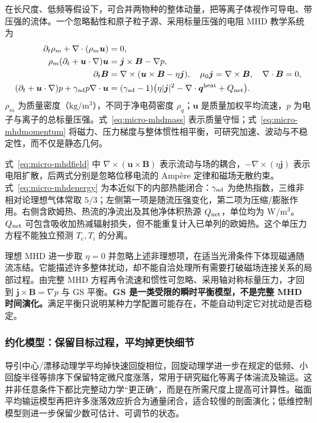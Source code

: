 \documentclass[12pt,fontset=none]{ctexart}
\numberwithin{equation}{section}
\numberwithin{table}{section}
\numberwithin{figure}{section}
\begin{document}
在长尺度、低频等假设下，可合并两物种的整体动量，把等离子体视作可导电、带压强的流体。一个忽略黏性和原子粒子源、采用标量压强的电阻 MHD 教学系统为\cite{Pmhd}
\begin{align}
 \partial_t\rho_m+\nabla\cdot(\rho_m\bm u)&=0,\label{eq:micro-mhdmass}\\
 \rho_m(\partial_t+\bm u\cdot\nabla)\bm u
 &=\bm j\times\bm B-\nabla p,\label{eq:micro-mhdmomentum}\\
 \partial_t\bm B&=\nabla\times(\bm u\times\bm B-\eta\bm j),
 \quad \mu_0\bm j=\nabla\times\bm B,\quad\nabla\cdot\bm B=0,\label{eq:micro-mhdfield}\\
 (\partial_t+\bm u\cdot\nabla)p+\gamma_{\rm ad}p\nabla\cdot\bm u
 &=(\gamma_{\rm ad}-1)\bigl(\eta|\bm j|^2-\nabla\cdot\bm q^{\rm heat}+Q_{\rm net}\bigr).
 \label{eq:micro-mhdenergy}
\end{align}
$\rho_m$ 为质量密度（$\mathrm{kg/m^3}$），不同于净电荷密度 $\rho_q$；$\bm u$ 是质量加权平均流速，$p$ 为电子与离子的总标量压强。式~\eqref{eq:micro-mhdmass} 表示质量守恒；式~\eqref{eq:micro-mhdmomentum} 将磁力、压力梯度与整体惯性相平衡，可研究加速、波动与不稳定性，而不仅是静态几何。

式~\eqref{eq:micro-mhdfield} 中 $\nabla\times(\bm u\times\bm B)$ 表示流动与场的耦合，$-\nabla\times(\eta\bm j)$ 表示电阻扩散，后两式分别是忽略位移电流的 Ampère 定律和磁场无散约束。式~\eqref{eq:micro-mhdenergy} 为本近似下的内部热能闭合：$\gamma_{\rm ad}$ 为绝热指数，三维非相对论理想气体常取 $5/3$；左侧第一项是随流压强变化，第二项为压缩/膨胀作用。右侧含欧姆热、热流的净流出及其他净体积热源 $Q_{\rm net}$，单位均为 $\mathrm{W/m^3}$。$Q_{\rm net}$ 可包含吸收加热减辐射损失，但不能重复计入已单列的欧姆热。这个单压力方程不能独立预测 $T_e,T_i$ 的分离。

理想 MHD 进一步取 $\eta=0$ 并忽略上述非理想项，在适当光滑条件下体现磁通随流冻结。它能描述许多整体扰动，却不能自洽处理所有需要打破磁场连接关系的局部过程。由完整 MHD 方程再令流速和惯性可忽略、采用轴对称标量压力，才回到 $\bm j\times\bm B=\nabla p$ 与 GS 平衡。\textbf{GS 是一类受限的瞬时平衡模型，不是完整 MHD 时间演化。}满足平衡只说明某种力学配置可能存在，不能自动判定它对扰动是否稳定。

\subsubsection{约化模型：保留目标过程，平均掉更快细节}

导引中心/漂移动理学平均掉快速回旋相位，回旋动理学进一步在规定的低频、小回旋半径等排序下保留特定微尺度涨落，常用于研究磁化等离子体湍流及输运\cite{Pgyro}。这并非任意条件下都比完整动力学``更正确''，而是在所需尺度上提高可计算性。磁面平均输运模型再把许多涨落效应折合为通量闭合，适合较慢的剖面演化；低维控制模型则进一步保留少数可估计、可调节的状态。
\end{document}
